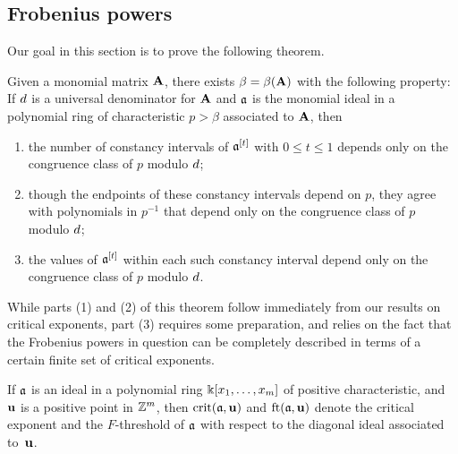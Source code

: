 \documentclass{article}
\begin{document}
\subsection{Frobenius powers}
\label{Fobenius powers: SS}

Our goal in this section is to prove the following theorem.

\begin{theorem}
	\label{frobenius-powers-main: T}
	Given a monomial matrix $\mathbf{A}$, there exists $\beta = \beta(\mathbf{A})$ with the following property\textup:
        If $d$ is a universal denominator for $\mathbf{A}$ and $\mathfrak{a}$ is the monomial ideal in a polynomial ring of characteristic $p>\beta$ associated to $\mathbf{A}$, then 
	\begin{enumerate}[$(1)$]
	\item the number of constancy intervals of $\mathfrak{a}^{[t]}$ with $0 \le t \le 1$ depends only on the congruence class of $p$ modulo $d$\textup;
	\item though the endpoints of these constancy intervals depend on $p$, they agree with polynomials in $p^{-1}$ that depend only on the congruence class of $p$ modulo $d$\textup;
	\item the values of $\mathfrak{a}^{[t]}$ within each such constancy interval depend only on the congruence class of $p$ modulo $d$.
	\end{enumerate}	
\end{theorem}

While parts (1) and (2) of this theorem follow immediately from our results on critical exponents, part (3) requires some preparation, and relies on the fact that the Frobenius powers in question can be completely described in terms of a certain finite set of critical exponents.

\begin{notation}
   If $\mathfrak{a}$ is an ideal in a polynomial ring $\Bbbk[x_1,\ldots,x_m]$ of positive characteristic, and $\mathbf{u}$ is a positive point in $\mathbb{Z}^m$, then $\operatorname{crit}(\mathfrak{a},\mathbf{u})$ and $\operatorname{ft}(\mathfrak{a}, \mathbf{u})$ denote the critical exponent and the $F$-threshold of $\mathfrak{a}$ with respect to the diagonal ideal associated to~$\mathbf{u}$.
\end{notation}
\end{document}
